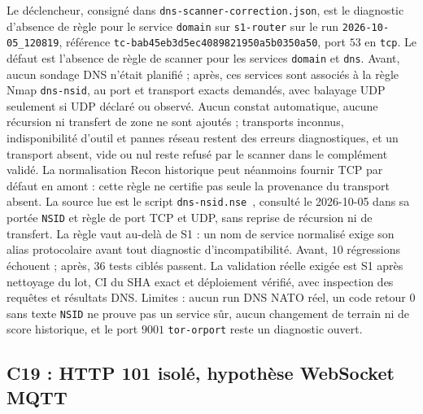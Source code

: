 \documentclass[11pt,a4paper]{article}
\newcommand{\code}[1]{{\urlstyle{tt}\nolinkurl{#1}}}
\begin{document}
Le déclencheur, consigné dans \code{dns-scanner-correction.json}, est le diagnostic d’absence de règle pour le service \code{domain} sur \code{s1-router} sur le run \code{2026-10-05_120819}, référence \code{tc-bab45eb3d5ec4089821950a5b0350a50}, port $53$ en \code{tcp}. Le défaut est l'absence de règle de scanner pour les services \code{domain} et \code{dns}. Avant, aucun sondage DNS n'était planifié ; après, ces services sont associés à la règle Nmap \code{dns-nsid}, au port et transport exacts demandés, avec balayage UDP seulement si UDP déclaré ou observé. Aucun constat automatique, aucune récursion ni transfert de zone ne sont ajoutés ; transports inconnus, indisponibilité d'outil et pannes réseau restent des erreurs diagnostiques, et un transport absent, vide ou nul reste refusé par le scanner dans le complément validé. La normalisation Recon historique peut néanmoins fournir TCP par défaut en amont : cette règle ne certifie pas seule la provenance du transport absent. La source lue est le script \code{dns-nsid.nse}~\cite{dns-nsid}, consulté le 2026-10-05 dans sa portée \code{NSID} et règle de port TCP et UDP, sans reprise de récursion ni de transfert. La règle vaut au-delà de S1 : un nom de service normalisé exige son alias protocolaire avant tout diagnostic d'incompatibilité. Avant, $10$ régressions échouent ; après, $36$ tests ciblés passent. La validation réelle exigée est S1 après nettoyage du lot, CI du SHA exact et déploiement vérifié, avec inspection des requêtes et résultats DNS. Limites : aucun run DNS NATO réel, un code retour $0$ sans texte \code{NSID} ne prouve pas un service sûr, aucun changement de terrain ni de score historique, et le port $9001$ \code{tor-orport} reste un diagnostic ouvert.

\subsection{C19 : HTTP 101 isolé, hypothèse WebSocket MQTT}
\label{sec:c19}
\end{document}
